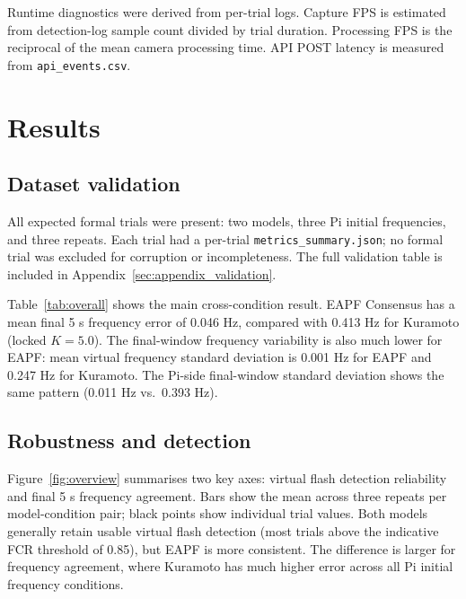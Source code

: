 \documentclass[11pt,a4paper]{article}
\newcommand{\tabledir}{tables}
\begin{document}
Runtime diagnostics were derived from per-trial logs. Capture FPS is estimated
from detection-log sample count divided by trial duration. Processing FPS is
the reciprocal of the mean camera processing time. API POST latency is measured
from \texttt{api\_events.csv}.

\section{Results}

\subsection{Dataset validation}

All expected formal trials were present: two models, three Pi initial
frequencies, and three repeats. Each trial had a per-trial
\texttt{metrics\_summary.json}; no formal trial was excluded for corruption or
incompleteness. The full validation table is included in
Appendix~\ref{sec:appendix_validation}.



Table~\ref{tab:overall} shows the main cross-condition result. EAPF Consensus
has a mean final 5 s frequency error of 0.046 Hz, compared with 0.413 Hz for
Kuramoto (locked $K=5.0$). The final-window frequency variability is also much
lower for EAPF: mean virtual frequency standard deviation is 0.001 Hz for EAPF
and 0.247 Hz for Kuramoto. The Pi-side final-window standard deviation shows
the same pattern (0.011 Hz vs.\ 0.393 Hz).



\subsection{Robustness and detection}

Figure~\ref{fig:overview} summarises two key axes: virtual flash detection
reliability and final 5 s frequency agreement. Bars show the mean across three
repeats per model-condition pair; black points show individual trial values.
Both models generally retain usable virtual flash detection (most trials above
the indicative FCR threshold of 0.85), but EAPF is more consistent. The
difference is larger for frequency agreement, where Kuramoto has much higher
error across all Pi initial frequency conditions.
\end{document}
